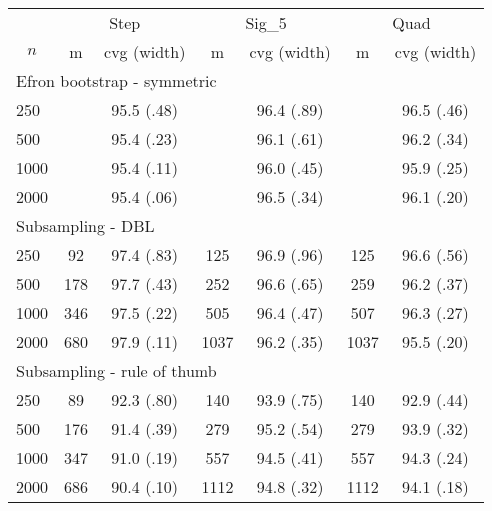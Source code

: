 \begin{tabular}{lcccccc}
   \toprule
 
           & \multicolumn{2}{c}{Step}& \multicolumn{2}{c}{Sig\_5}& \multicolumn{2}{c}{Quad} \\ 
             \cmidrule(l{2pt}r{2pt}){2-3} \cmidrule(l{2pt}r{2pt}){4-5} \cmidrule(l{2pt}r{2pt}){6-7} 
             \multicolumn{1}{c}{$n$} & \multicolumn{1}{c}{m}& \multicolumn{1}{c}{cvg (width)}& \multicolumn{1}{c}{m}& \multicolumn{1}{c}{cvg (width)}& \multicolumn{1}{c}{m}& \multicolumn{1}{c}{cvg (width)} \\  
             \hline   
 \multicolumn{7}{l}{Efron bootstrap - symmetric} \\ 
250 &  & 95.5 (.48) &  & 96.4 (.89) &  & 96.5 (.46) \\ 
  500 &  & 95.4 (.23) &  & 96.1 (.61) &  & 96.2 (.34) \\ 
  1000 &  & 95.4 (.11) &  & 96.0 (.45) &  & 95.9 (.25) \\ 
  2000 &  & 95.4 (.06) &  & 96.5 (.34) &  & 96.1 (.20) \\ 
       \hline   
 \multicolumn{7}{l}{Subsampling - DBL} \\ 
250 & 92 & 97.4 (.83) & 125 & 96.9 (.96) & 125 & 96.6 (.56) \\ 
  500 & 178 & 97.7 (.43) & 252 & 96.6 (.65) & 259 & 96.2 (.37) \\ 
  1000 & 346 & 97.5 (.22) & 505 & 96.4 (.47) & 507 & 96.3 (.27) \\ 
  2000 & 680 & 97.9 (.11) & 1037 & 96.2 (.35) & 1037 & 95.5 (.20) \\ 
       \hline   
 \multicolumn{7}{l}{Subsampling - rule of thumb} \\ 
250 & 89 & 92.3 (.80) & 140 & 93.9 (.75) & 140 & 92.9 (.44) \\ 
  500 & 176 & 91.4 (.39) & 279 & 95.2 (.54) & 279 & 93.9 (.32) \\ 
  1000 & 347 & 91.0 (.19) & 557 & 94.5 (.41) & 557 & 94.3 (.24) \\ 
  2000 & 686 & 90.4 (.10) & 1112 & 94.8 (.32) & 1112 & 94.1 (.18) \\ 
   \hline
\end{tabular}
